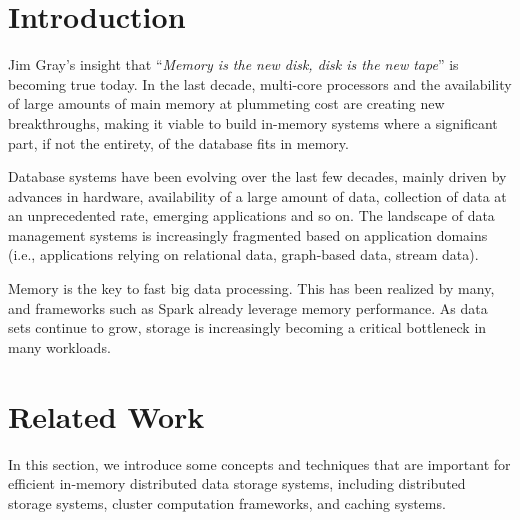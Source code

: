 \documentclass[twocolumn]{article}
\newcommand*\DNA{\textsc{dna}}
\newcommand*\Let[2]{\State #1 $\gets$ #2}
\begin{document}

\section{Introduction}
Jim Gray's insight that ``\textit{Memory is the new disk, disk is the new tape}'' is becoming true today. 
In the last decade, multi-core processors and the availability of large amounts of main memory at
plummeting cost are creating new breakthroughs, making it viable to
build in-memory systems where a significant part, if not the entirety,
of the database fits in memory.%

Database systems have been evolving over the last few decades, mainly
driven by advances in hardware, availability of a large amount of data,
collection of data at an unprecedented rate, emerging applications and
so on. The landscape of data management systems is increasingly
fragmented based on application domains (i.e., applications relying on
relational data, graph-based data, stream data).

Memory is the key to fast big data processing. This has been realized by many, and frameworks such as Spark \cite{RDD:2012} already leverage memory performance. As data sets continue to grow, storage is increasingly becoming a critical bottleneck in many workloads.

\section{Related Work}
In this section, we introduce some concepts and techniques that are important for efficient in-memory distributed data storage systems, including distributed storage systems, cluster computation frameworks, and caching systems.
\end{document}
